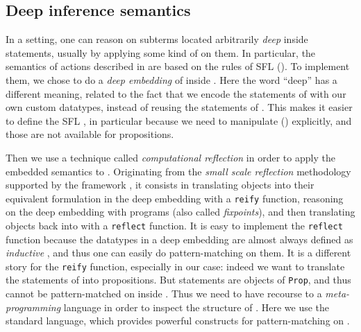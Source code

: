\subsection{Deep inference semantics}

In a  setting, one can reason on subterms located arbitrarily
\emph{deep} inside statements, usually by applying some kind of  on them. In particular, the semantics of  actions described in
 are based on the rules of SFL (). To implement them, we
chose to do a \emph{deep embedding} of  inside .
Here the word ``deep'' has a different meaning, related to the fact that we
encode the statements of  with our own custom datatypes,
instead of reusing the statements of . This makes it easier to define
the SFL , in particular because we need to manipulate
\emph{} () explicitly, and those are
not available for  propositions.

Then we use a technique called \emph{computational reflection} in order to apply
the embedded  semantics to  . Originating from the
\emph{small scale reflection} methodology supported by the {\ssreflect}
framework \cite{SSR}, it consists in translating  objects into their
equivalent formulation in the deep embedding with a \texttt{reify} function,
reasoning on the deep embedding with  programs (also called
\emph{fixpoints}), and then translating objects back into  with a
\texttt{reflect} function. It is easy to implement the \texttt{reflect} function
because the datatypes in a deep embedding are almost always defined as
\emph{inductive} , and thus one can easily do pattern-matching on them. It
is a different story for the \texttt{reify} function, especially in our case:
indeed we want to translate the statements of   into 
propositions. But  statements are objects of  \texttt{Prop}, and thus
cannot be pattern-matched on inside .
Thus we need to have recourse to a \emph{meta-programming} language in order to
inspect the structure of  . Here we use the standard {\ltac} language,
which provides powerful constructs for pattern-matching on .

